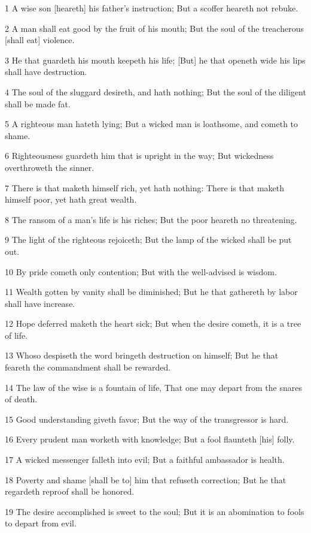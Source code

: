 \par 1 A wise son [heareth] his father's instruction; But a scoffer heareth not rebuke.
\par 2 A man shall eat good by the fruit of his mouth; But the soul of the treacherous [shall eat] violence.
\par 3 He that guardeth his mouth keepeth his life; [But] he that openeth wide his lips shall have destruction.
\par 4 The soul of the sluggard desireth, and hath nothing; But the soul of the diligent shall be made fat.
\par 5 A righteous man hateth lying; But a wicked man is loathsome, and cometh to shame.
\par 6 Righteousness guardeth him that is upright in the way; But wickedness overthroweth the sinner.
\par 7 There is that maketh himself rich, yet hath nothing: There is that maketh himself poor, yet hath great wealth.
\par 8 The ransom of a man's life is his riches; But the poor heareth no threatening.
\par 9 The light of the righteous rejoiceth; But the lamp of the wicked shall be put out.
\par 10 By pride cometh only contention; But with the well-advised is wisdom.
\par 11 Wealth gotten by vanity shall be diminished; But he that gathereth by labor shall have increase.
\par 12 Hope deferred maketh the heart sick; But when the desire cometh, it is a tree of life.
\par 13 Whoso despiseth the word bringeth destruction on himself; But he that feareth the commandment shall be rewarded.
\par 14 The law of the wise is a fountain of life, That one may depart from the snares of death.
\par 15 Good understanding giveth favor; But the way of the transgressor is hard.
\par 16 Every prudent man worketh with knowledge; But a fool flaunteth [his] folly.
\par 17 A wicked messenger falleth into evil; But a faithful ambassador is health.
\par 18 Poverty and shame [shall be to] him that refuseth correction; But he that regardeth reproof shall be honored.
\par 19 The desire accomplished is sweet to the soul; But it is an abomination to fools to depart from evil.
